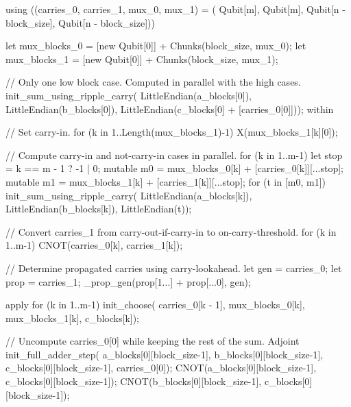 \documentclass[onecolumn,unpublished]{quantumarticle}
\theoremstyle{definition}
\theoremstyle{definition}
\theoremstyle{definition}
\begin{document}
\begin{qsharp}
{{        using ((carries_0, carries_1, mux_0, mux_1) = (
                Qubit[m], 
                Qubit[m], 
                Qubit[n - block_size], 
                Qubit[n - block_size])) {
            let mux_blocks_0 = [new Qubit[0]] + Chunks(block_size, mux_0);
            let mux_blocks_1 = [new Qubit[0]] + Chunks(block_size, mux_1);

            // Only one low block case. Computed in parallel with the high cases.
            init_sum_using_ripple_carry(
                LittleEndian(a_blocks[0]),
                LittleEndian(b_blocks[0]),
                LittleEndian(c_blocks[0] + [carries_0[0]]));
            within {
                // Set carry-in.
                for (k in 1..Length(mux_blocks_1)-1) {
                    X(mux_blocks_1[k][0]);
                }

                // Compute carry-in and not-carry-in cases in parallel.
                for (k in 1..m-1) {
                    let stop = k == m - 1 ? -1 | 0;
                    mutable m0 = mux_blocks_0[k] + [carries_0[k]][...stop];
                    mutable m1 = mux_blocks_1[k] + [carries_1[k]][...stop];
                    for (t in [m0, m1]) {
                        init_sum_using_ripple_carry(
                            LittleEndian(a_blocks[k]),
                            LittleEndian(b_blocks[k]),
                            LittleEndian(t));
                    }
                }
                
                // Convert carries_1 from carry-out-if-carry-in to on-carry-threshold.
                for (k in 1..m-1) {
                    CNOT(carries_0[k], carries_1[k]);
                }

                // Determine propagated carries using carry-lookahead.
                let gen = carries_0;
                let prop = carries_1;
                _prop_gen(prop[1...] + prop[...0], gen);
            } apply {
                for (k in 1..m-1) {
                    init_choose(
                        carries_0[k - 1],
                        mux_blocks_0[k], 
                        mux_blocks_1[k], 
                        c_blocks[k]);
                }
            }

            // Uncompute carries_0[0] while keeping the rest of the sum.
            Adjoint init_full_adder_step(
                a_blocks[0][block_size-1],
                b_blocks[0][block_size-1],
                c_blocks[0][block_size-1],
                carries_0[0]);
            CNOT(a_blocks[0][block_size-1], c_blocks[0][block_size-1]);
            CNOT(b_blocks[0][block_size-1], c_blocks[0][block_size-1]);
        }
    }

}
\end{qsharp}
\end{document}
